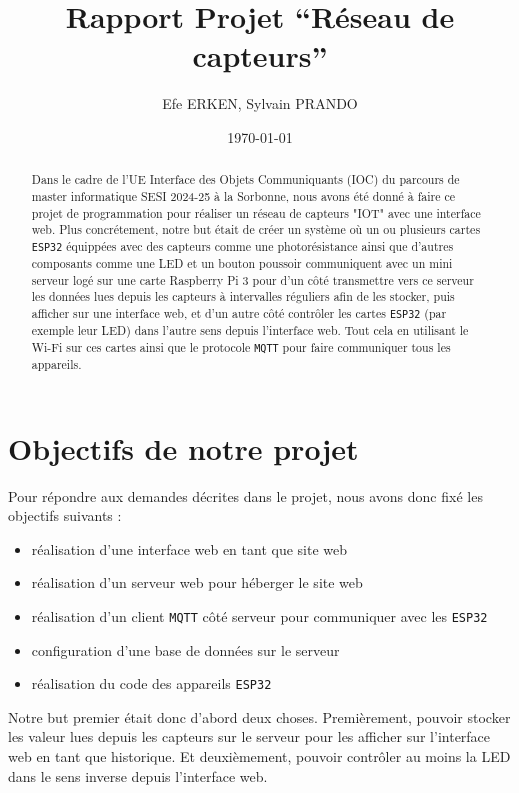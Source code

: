 \documentclass[12pt]{article}
\author{Efe ERKEN, Sylvain PRANDO}
\date{\today}
\title{Rapport Projet ``Réseau de capteurs''}
\begin{document}
\maketitle

\begin{abstract}
    Dans le cadre de l'UE Interface des Objets Communiquants (IOC) du parcours de master informatique SESI 2024-25 à la
    Sorbonne, nous avons été donné à faire ce projet de programmation pour réaliser un réseau de capteurs "IOT" avec une
    interface web. Plus concrétement, notre but était de créer un système où un ou plusieurs cartes \texttt{ESP32} équippées avec des
    capteurs comme une photorésistance ainsi que d'autres composants comme une LED et un bouton poussoir communiquent avec
    un mini serveur logé sur une carte Raspberry Pi 3 pour d'un côté transmettre vers ce serveur les données lues depuis les
    capteurs à intervalles réguliers afin de les stocker, puis afficher sur une interface web, et d'un autre côté contrôler les cartes \texttt{ESP32} (par
    exemple leur LED) dans l'autre sens depuis l'interface web. Tout cela en utilisant le Wi-Fi sur ces cartes ainsi que le
    protocole \texttt{MQTT} pour faire communiquer tous les appareils.
\end{abstract}

\section{Objectifs de notre projet}
Pour répondre aux demandes décrites dans le projet, nous avons donc fixé les objectifs suivants :
\begin{itemize}
    \item réalisation d'une interface web en tant que site web
    \item réalisation d'un serveur web pour héberger le site web
    \item réalisation d'un client \texttt{MQTT} côté serveur pour communiquer avec les \texttt{ESP32}
    \item configuration d'une base de données sur le serveur
    \item réalisation du code des appareils \texttt{ESP32}
\end{itemize} \hfill \break

Notre but premier était donc d'abord deux choses. Premièrement, pouvoir stocker les valeur lues depuis les capteurs sur le serveur pour les afficher sur l'interface web en tant que historique.
Et deuxièmement, pouvoir contrôler au moins la LED dans le sens inverse depuis l'interface web.
\end{document}
